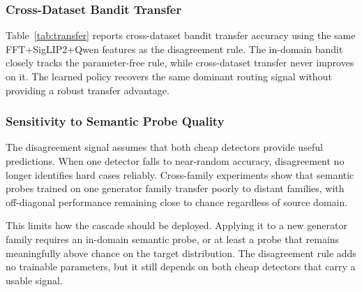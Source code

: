 \documentclass{ieeeaccess}
\begin{document}
\subsubsection{Cross-Dataset Bandit Transfer}

Table~\ref{tab:transfer} reports cross-dataset bandit transfer accuracy using the same
FFT+SigLIP2+Qwen features as the disagreement rule. The in-domain bandit closely tracks
the parameter-free rule, while cross-dataset transfer never improves on it. The learned
policy recovers the same dominant routing signal without providing a robust transfer
advantage.



\begin{table}[h]
\centering
\caption{Cross-dataset contextual-bandit transfer on fixed held-out subsets using FFT+SigLIP2+Qwen features. Results are interpreted within this transfer experiment.}
\label{tab:transfer}
\end{table}


\subsubsection{Sensitivity to Semantic Probe Quality}

The disagreement signal assumes that both cheap detectors provide useful predictions.
When one detector falls to near-random accuracy, disagreement no longer identifies hard
cases reliably. Cross-family experiments show that semantic probes trained on one
generator family transfer poorly to distant families, with off-diagonal performance
remaining close to chance regardless of source domain.

This limits how the cascade should be deployed. Applying it to a new generator family
requires an in-domain semantic probe, or at least a probe that remains meaningfully above
chance on the target distribution. The disagreement rule adds no trainable parameters,
but it still depends on both cheap detectors that carry a usable signal.
\end{document}

